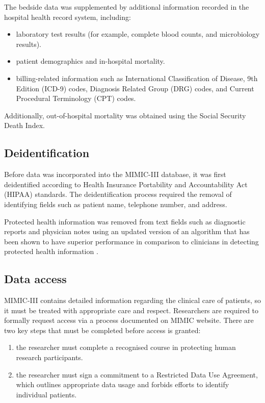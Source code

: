 \documentclass[english]{article}
\begin{document}
The bedside data was supplemented by additional information recorded in the hospital health record system, including:
\begin{itemize}
  \item laboratory test results (for example, complete blood counts, and microbiology results).
  \item patient demographics and in-hospital mortality.
  \item billing-related information such as International Classification of Disease, 9th Edition (ICD-9) codes, Diagnosis Related Group (DRG) codes, and Current Procedural Terminology (CPT) codes.
\end{itemize}
Additionally, out-of-hospital mortality was obtained using the Social Security Death Index.

\subsection*{Deidentification}

Before data was incorporated into the MIMIC-III database, it was first deidentified according to Health Insurance Portability and Accountability Act (HIPAA) standards. The deidentification process required the removal of identifying fields such as patient name, telephone number, and address.

Protected health information was removed from text fields such as diagnostic reports and physician notes using an updated version of an algorithm that has been shown to have superior performance in comparison to clinicians in detecting protected health information \cite{cite4}.

\subsection*{Data access}

MIMIC-III contains detailed information regarding the clinical care of patients, so it must be treated with appropriate care and respect. Researchers are required to formally request access via a process documented on MIMIC website. There are two key steps that must be completed before access is granted:

\begin{enumerate}
  \item the researcher must complete a recognised course in protecting human research participants.
  \item the researcher must sign a commitment to a Restricted Data Use Agreement, which outlines appropriate data usage and forbids efforts to identify individual patients.
\end{enumerate}
\end{document}
